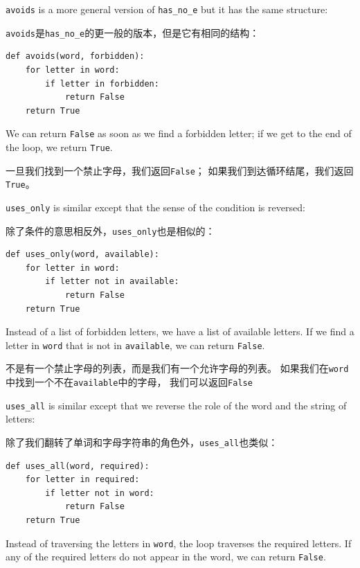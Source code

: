 \documentclass[10pt]{book}
\begin{document}
\begin{CJK}{UTF8}{gbsn}


{\tt avoids} is a more general version of \verb"has_no_e" but it
has the same structure:

{\tt avoids}是\verb"has_no_e"的更一般的版本，但是它有相同的结构：

\begin{verbatim}
def avoids(word, forbidden):
    for letter in word:
        if letter in forbidden:
            return False
    return True
\end{verbatim}
%
We can return {\tt False} as soon as we find a forbidden letter;
if we get to the end of the loop, we return {\tt True}.

一旦我们找到一个禁止字母，我们返回{\tt False}；
如果我们到达循环结尾，我们返回{\tt True}。

\verb"uses_only" is similar except that the sense of the condition
is reversed:

除了条件的意思相反外，\verb"uses_only"也是相似的：

\begin{verbatim}
def uses_only(word, available):
    for letter in word: 
        if letter not in available:
            return False
    return True
\end{verbatim}
%
Instead of a list of forbidden letters, we have a list of available
letters.  If we find a letter in {\tt word} that is not in
{\tt available}, we can return {\tt False}.

不是有一个禁止字母的列表，而是我们有一个允许字母的列表。
如果我们在{\tt word}中找到一个不在{\tt available}中的字母，
我们可以返回{\tt False}

\verb"uses_all" is similar except that we reverse the role
of the word and the string of letters:

除了我们翻转了单词和字母字符串的角色外，\verb"uses_all"也类似：

\begin{verbatim}
def uses_all(word, required):
    for letter in required: 
        if letter not in word:
            return False
    return True
\end{verbatim}
%
Instead of traversing the letters in {\tt word}, the loop
traverses the required letters.  If any of the required letters
do not appear in the word, we can return {\tt False}.


\end{CJK}
\end{document}
